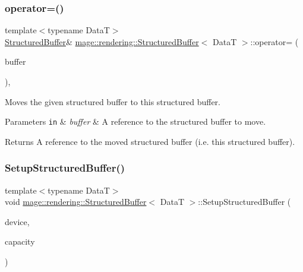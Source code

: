 \subsubsection{\texorpdfstring{operator=()}{operator=()}\hspace{0.1cm}{\footnotesize\ttfamily [2/2]}}
{\footnotesize\ttfamily template$<$typename DataT$>$ \\
\mbox{\hyperlink{classmage_1_1rendering_1_1_structured_buffer}{Structured\+Buffer}}\& \mbox{\hyperlink{classmage_1_1rendering_1_1_structured_buffer}{mage\+::rendering\+::\+Structured\+Buffer}}$<$ DataT $>$\+::operator= (\begin{DoxyParamCaption}\item[{\mbox{\hyperlink{classmage_1_1rendering_1_1_structured_buffer}{Structured\+Buffer}}$<$ DataT $>$ \&\&}]{buffer }\end{DoxyParamCaption})\hspace{0.3cm}{\ttfamily [default]}, {\ttfamily [noexcept]}}

Moves the given structured buffer to this structured buffer.


\begin{DoxyParams}[1]{Parameters}
\mbox{\tt in}  & {\em buffer} & A reference to the structured buffer to move. \\
\hline
\end{DoxyParams}
\begin{DoxyReturn}{Returns}
A reference to the moved structured buffer (i.\+e. this structured buffer). 
\end{DoxyReturn}
\mbox{\label{classmage_1_1rendering_1_1_structured_buffer_aa8777c23aa6135e2d75a786df3937807}} 
\subsubsection{\texorpdfstring{Setup\+Structured\+Buffer()}{SetupStructuredBuffer()}}
{\footnotesize\ttfamily template$<$typename DataT$>$ \\
void \mbox{\hyperlink{classmage_1_1rendering_1_1_structured_buffer}{mage\+::rendering\+::\+Structured\+Buffer}}$<$ DataT $>$\+::Setup\+Structured\+Buffer (\begin{DoxyParamCaption}\item[{I\+D3\+D11\+Device \&}]{device,  }\item[{size\+\_\+t}]{capacity }\end{DoxyParamCaption})\hspace{0.3cm}{\ttfamily [private]}}

